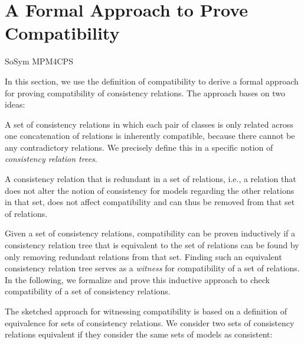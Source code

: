 \section{A Formal Approach to Prove Compatibility}
\label{chap:formal:approach}

\begin{copiedFrom}{SoSym MPM4CPS}

In this section, we use the definition of compatibility to derive a formal approach for proving compatibility of consistency relations.
The approach bases on two ideas:
\begin{properenumerate}
    \item A set of consistency relations in which each pair of classes is only related across one concatenation of relations is inherently compatible, because there cannot be any contradictory relations. We precisely define this in a specific notion of \emph{consistency relation trees}.
    \item A consistency relation that is redundant in a set of relations, i.e., a relation that does not alter the notion of consistency for models regarding the other relations in that set, does not affect compatibility and can thus be removed from that set of relations. %
\end{properenumerate}
Given a set of consistency relations, compatibility can be proven inductively if a consistency relation tree that is equivalent to the set of relations can be found by only removing redundant relations from that set.
Finding such an equivalent consistency relation tree serves as a \emph{witness} for compatibility of a set of relations.
In the following, we formalize and prove this inductive approach to check compatibility of a set of consistency relations.

The sketched approach for witnessing compatibility is based on a definition of equivalence for sets of consistency relations.
We consider two sets of consistency relations equivalent if they consider the same sets of models as consistent:


\end{copiedFrom}
